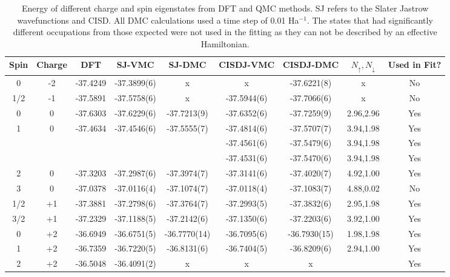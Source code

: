 \documentclass[aip,jcp,twocolumn,10pt]{revtex4-1}
\begin{document}
\begin{table*}[htpb]
\begin{center}
\begin{tabular}{|c|c|c|c|c|c|c|c|c|}
\hline
Spin & Charge & DFT      &   SJ-VMC      &  SJ-DMC	 &  CISDJ-VMC    &  CISDJ-DMC  & $N_\uparrow,N_\downarrow$ & Used in Fit?\tabularnewline 
\hline							      
 0   & -2   & -37.4249   & -37.3899(6)   & x      	 & x             & -37.6221(8) &  x         & No \tabularnewline
\hline							      
 1/2 & -1   & -37.5891   & -37.5758(6)   & x      	 & -37.5944(6)   & -37.7066(6) &  x         & No \tabularnewline
\hline							      
 0   &  0   & -37.6303   & -37.6229(6)   & -37.7213(9)	 & -37.6352(6)   & -37.7259(9) & 2.96,2.96  & Yes \tabularnewline
\hline							      
 1   &  0   & -37.4634   & -37.4546(6)   & -37.5555(7)	 & -37.4814(6)   & -37.5707(7) & 3.94,1.98  & Yes \tabularnewline
     &      &            &               &          	 & -37.4561(6)   & -37.5479(6) & 3.94,1.98  & Yes \tabularnewline
     &      &            &               &       	 & -37.4531(6)   & -37.5470(6) & 3.94,1.98  & Yes \tabularnewline
\hline							      
 2   &  0   & -37.3203   & -37.2987(6)   & -37.3974(7)	 & -37.3141(6)   & -37.4020(7) & 4.92,1.00  & Yes \tabularnewline
\hline							      
 3   &  0   & -37.0378   & -37.0116(4)   & -37.1074(7)	 & -37.0118(4)   & -37.1083(7) & 4.88,0.02  & No \tabularnewline
\hline							      
 1/2 & +1   & -37.3881   & -37.2798(6)   & -37.3764(7)	 & -37.2993(5)   & -37.3832(6) & 2.95,1.98  & Yes \tabularnewline
\hline							      
 3/2 & +1   & -37.2329   & -37.1188(5)   & -37.2142(6)	 & -37.1350(6)   & -37.2203(6) & 3.92,1.00  & Yes \tabularnewline
\hline							      
 0   & +2   & -36.6949   & -36.6751(5)   & -36.7770(14)	 & -36.7095(6)   & -36.7930(15)& 1.98,1.98  & Yes \tabularnewline
\hline							      
 1   & +2   & -36.7359   & -36.7220(5)   & -36.8131(6)	 & -36.7404(5)   & -36.8209(6) & 2.94,1.00  & Yes \tabularnewline
\hline							      
 2   & +2   & -36.5048   & -36.4091(2)   & x             & x             & x           &            & Yes \tabularnewline
\hline 
\end{tabular}
\caption{Energy of different charge and spin eigenstates from DFT and QMC methods. 
SJ refers to the Slater Jastrow wavefunctions and CISD. All DMC calculations used a time step of 0.01 Ha$^{-1}$. 
The states that had significantly different occupations from 
those expected were not used in the fitting as they can not be 
described by an effective Hamiltonian.}
\end{center}
\label{tab:benzene}
\end{table*}
\end{document}
